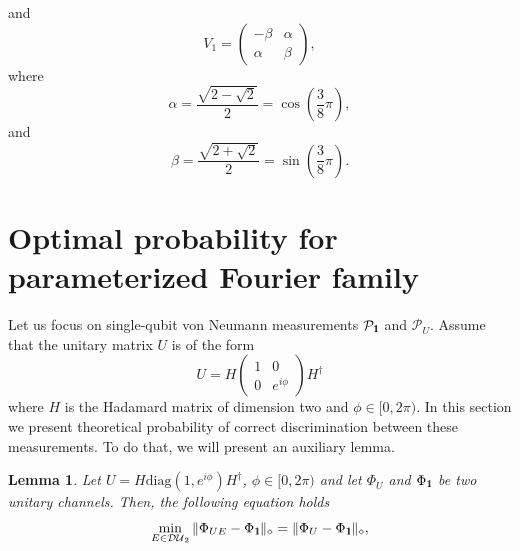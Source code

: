 \documentclass[preprint,12pt, a4paper, dvipsnames]{elsarticle}
\newcommand{\1}{{\rm 1\hspace{-0.9mm}l}}
\newcommand{\Id}{{\rm 1\hspace{-0.9mm}l}}
\newcommand{\PP}{\mathcal{P}}
\newcommand{\diaguni}{\ensuremath{\mathcal{DU}}}
\newcommand{\diag}{\mathrm{diag}}
\newtheorem{lemma}{Lemma}
\theoremstyle{definition}
\begin{document}
 and \begin{equation}
 V_1 =
 \left(\begin{array}{cc} -\beta & \alpha \\ \alpha & \beta \end{array}\right),
 \end{equation}
 where \begin{equation}
 \alpha = \frac{\sqrt{2 - \sqrt{2}}}{2} = \cos\left( \frac{3}{8} \pi \right),
 \end{equation}
 and
 \begin{equation}
 \beta  = \frac{\sqrt{2  + \sqrt{2}}}{2} = \sin\left( \frac{3}{8} \pi \right).
 \end{equation}

\section{Optimal probability for parameterized Fourier family} \label{app:optimal-probability}
Let us focus on single-qubit von Neumann measurements $\PP_\1$ and $\PP_U$.
Assume that the unitary matrix $U$ is of the form
\begin{equation}
U = H
\left(\begin{array}{cc}1&0\\0&e^{i \phi}\end{array}\right)  H^\dagger
\end{equation}
where $H$ is the Hadamard matrix of dimension two and $\phi \in [0, 2 \pi)$.
In this section we present theoretical probability of correct
discrimination between these measurements. To do that, we will present an auxiliary lemma.
\begin{lemma}\label{lemma:min-e-optimal}
	Let $U = H \diag(1, e^{i \phi}) H^\dagger$, $\phi \in [0, 2\pi)$ and	let
	$\Phi_U$ and $\Phi_\Id$ be two unitary channels. Then, the following equation holds
	\begin{equation}
	\min_{E \in \diaguni_2} \|\Phi_{UE} -
	\Phi_\Id\|_\diamond = \|\Phi_{U} -
	\Phi_\Id\|_\diamond,
	\end{equation}
\end{lemma}
\end{document}
